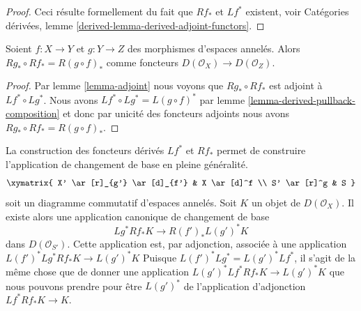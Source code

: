 \begin{proof}
Ceci résulte formellement du fait que $Rf_*$ et $Lf^*$ existent, voir Catégories dérivées, lemme \ref{derived-lemma-derived-adjoint-functors}.
\end{proof}

\begin{lemma}

\label{lemma-derived-pushforward-composition}
Soient $f : X \to Y$ et $g : Y \to Z$ des morphismes d'espaces annelés. Alors $Rg_* \circ Rf_* = R(g \circ f)_*$ comme foncteurs $D(\mathcal{O}_X) \to D(\mathcal{O}_Z)$.
\end{lemma}

\begin{proof}
Par lemme \ref{lemma-adjoint} nous voyons que $Rg_* \circ Rf_*$ est adjoint à $Lf^* \circ Lg^*$. Nous avons $Lf^* \circ Lg^* = L(g \circ f)^*$ par lemme \ref{lemma-derived-pullback-composition} et donc par unicité des foncteurs adjoints nous avons $Rg_* \circ Rf_* = R(g \circ f)_*$.
\end{proof}

\begin{remark}

\label{remark-base-change}

La construction des foncteurs dérivés $Lf^*$ et $Rf_*$
permet de construire l'application de changement de base en pleine généralité.
$$
\xymatrix{
X' \ar[r]_{g'} \ar[d]_{f'} &
X \ar[d]^f \\
S' \ar[r]^g &
S
}
$$
soit un diagramme commutatif d'espaces annelés. Soit $K$ un objet de
$D(\mathcal{O}_X)$. Il existe alors une application canonique de changement de base
$$
Lg^*Rf_*K \longrightarrow R(f')_*L(g')^*K
$$
dans $D(\mathcal{O}_{S'})$. Cette application est, par adjonction, associée à une application
$L(f')^*Lg^*Rf_*K \to L(g')^*K$
Puisque $L(f')^*Lg^* = L(g')^*Lf^*$, il s'agit de la même chose que de donner une application
$L(g')^*Lf^*Rf_*K \to L(g')^*K$
que nous pouvons prendre pour être $L(g')^*$ de l'application d'adjonction
$Lf^*Rf_*K \to K$.

\end{remark}


